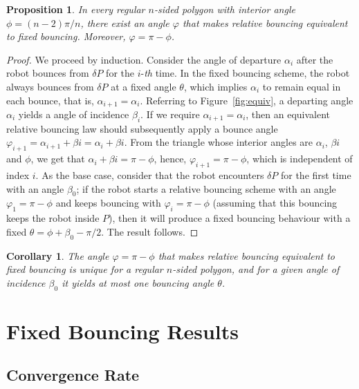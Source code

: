 \documentclass[10pt,a4paper]{article}
\newtheorem{corollary}{\bf Corollary}
\newtheorem{proposition}[theorem]{\bf Proposition}
\begin{document}
\begin{proposition} \label{Proposition:equivalency}
In every regular $n$-sided polygon with interior angle $\phi = (n - 2)\pi/n$, there exist an angle $\varphi$ that makes relative bouncing equivalent to fixed bouncing. Moreover, $\varphi = \pi - \phi$. 
\end{proposition}
\begin{proof}
We proceed by induction. Consider the angle of departure $\alpha_i$ after the robot bounces from $\delta P$ for the $i$-\textit{th} time. In the fixed bouncing scheme, the robot always bounces from $\delta P$ at a fixed angle $\theta$, which implies $\alpha_i$ to remain equal in each bounce, that is, $\alpha_{i+1} = \alpha_{i}$. Referring to Figure~\ref{fig:equiv}, a departing angle $\alpha_i$ yields a angle of incidence $\beta_{i}$. If we require $\alpha_{i+1} = \alpha_{i}$, then an equivalent relative bouncing law should subsequently apply a bounce angle $\varphi_{i+1}=\alpha_{i+1}+\beta{i}=\alpha_{i}+\beta{i}$. From the triangle whose interior angles are $\alpha_{i}$, $\beta{i}$ and $\phi$, we get that $\alpha_{i} + \beta{i} = \pi - \phi$, hence, $\varphi_{i+1} = \pi - \phi$, which is independent of index $i$. As the base case, consider that the robot encounters  $\delta P$ for the first time with an angle $\beta_{0}$; if the robot starts a relative bouncing scheme with an angle $\varphi_{1} = \pi - \phi$ and keeps bouncing with $\varphi_{i}= \pi - \phi$ (assuming that this bouncing keeps the robot inside $P$), then it will produce a fixed bouncing behaviour with a fixed $\theta=\phi + \beta_0 - \pi/2$. The result follows. 
\end{proof}

\begin{corollary} \label{Lemma:equivalency}
The angle $\varphi = \pi - \phi$ that makes relative bouncing equivalent to fixed bouncing is unique for a regular $n$-sided polygon, and for a given angle of incidence $\beta_0$ it yields at most one bouncing angle $\theta$. 
\end{corollary}


\section{Fixed Bouncing Results}

\subsection{Convergence Rate}
\end{document}
